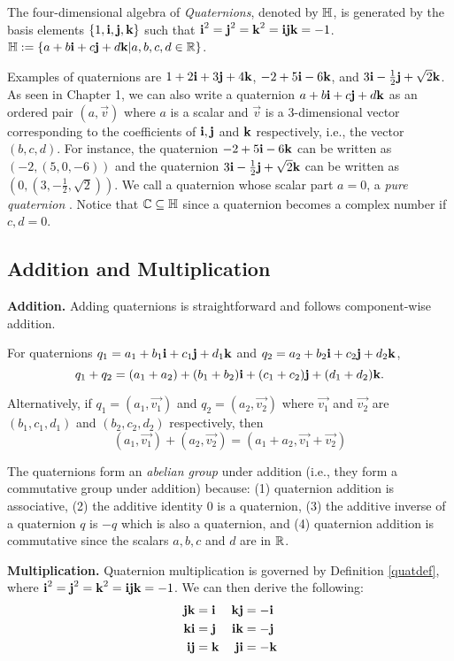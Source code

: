 \begin{definition}[Quaternion] \label{quatdef}
	\emph{\cite{stamaria}} The four-dimensional algebra of \emph{Quaternions}, denoted by $\operatorname{\mathbb{H}}$, is generated by the basis elements $\{1,\textbf{i},\textbf{j},\textbf{k}\}$ such that $\textbf{i}^2 = \textbf{j}^2 = \textbf{k}^2 = \textbf{i} \textbf{j} \textbf{k} = -1$. $\operatorname{\mathbb{H}} := \{a + b\textbf{i} + c\textbf{j} + d\textbf{k} | a,b,c,d \in \operatorname{\mathbb{R}}\}$. 
\end{definition}

Examples of quaternions are $1+2\textbf{i}+3\textbf{j}+4\textbf{k}$, $-2+5\textbf{i}-6\textbf{k}$, and $3\textbf{i}-\frac{1}{2}\textbf{j}+\sqrt{2}\textbf{k}$. As seen in Chapter 1, we can also write a quaternion $a + b\textbf{i} + c\textbf{j} + d\textbf{k}$ as an ordered pair $(a,\vec{v})$ where $a$ is a scalar and $\vec{v}$ is a 3-dimensional vector corresponding to the coefficients of $\textbf{i}, \textbf{j}$ and $\textbf{k}$ respectively, i.e., the vector $(b,c,d)$. For instance, the quaternion $-2+5\textbf{i}-6\textbf{k}$ can be written as $(-2,(5,0,-6))$ and the quaternion $3\textbf{i}-\frac{1}{2}\textbf{j}+\sqrt{2}\textbf{k}$ can be written as $(0,(3,-\frac{1}{2},\sqrt{2}))$. We call a quaternion whose scalar part $a = 0$, a \emph{pure quaternion} \cite{lerios} \cite{mathoma}. Notice that $\operatorname{\mathbb{C}} \subseteq \operatorname{\mathbb{H}}$ since a quaternion becomes a complex number if $c,d = 0$.
\newpage
\subsection{Addition and Multiplication}

\textbf{Addition.} Adding quaternions is straightforward and follows component-wise addition.
\begin{definition} \label{quatp}
 \emph{\cite{lerios}} For quaternions $q_1 = a_1 + b_1\textbf{i} + c_1\textbf{j} + d_1\textbf{k}$ and $q_2 = a_2 + b_2\textbf{i} + c_2\textbf{j} + d_2\textbf{k}$, $$q_1+q_2 = (a_1+a_2) + (b_1+b_2)\textbf{i} + (c_1+c_2)\textbf{j} + (d_1+d_2)\textbf{k}.$$ 
\end{definition}
Alternatively, if $q_1 = (a_1,\vec{v_1})$ and $q_2 = (a_2,\vec{v_2})$ where $\vec{v_1}$ and $\vec{v_2}$ are $(b_1,c_1,d_1)$ and $(b_2,c_2,d_2)$ respectively, then $$(a_1,\vec{v_1})+(a_2,\vec{v_2}) = (a_1+a_2,\vec{v_1}+\vec{v_2})$$ 

The quaternions form an \emph{abelian group} under addition (i.e., they form a commutative group under addition) because: (1) quaternion addition is associative, (2) the additive identity 0 is a quaternion, (3) the additive inverse of a quaternion $q$ is $-q$ which is also a quaternion, and (4) quaternion addition is commutative since the scalars $a,b,c$ and $d$ are in $\operatorname{\mathbb{R}}$. 

\noindent\textbf{Multiplication.} Quaternion multiplication is governed by Definition \ref{quatdef}, where $\textbf{i}^2 = \textbf{j}^2 = \textbf{k}^2 = \textbf{i} \textbf{j} \textbf{k} = -1$. We can then derive the following: 
\begin{align*} 
	\textbf{j}\textbf{k} &= \textbf{i} & \textbf{k}\textbf{j} &= -\textbf{i} \\
	\textbf{k}\textbf{i} &= \textbf{j} & \textbf{i}\textbf{k} &= -\textbf{j} \\
	\textbf{i}\textbf{j} &= \textbf{k} & \textbf{j}\textbf{i} &= -\textbf{k}
\end{align*}

